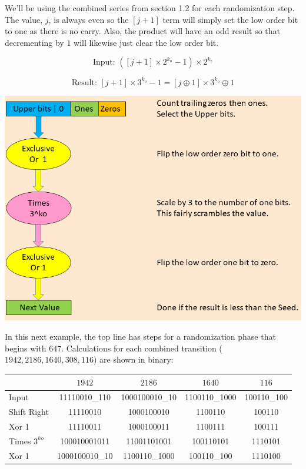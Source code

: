 \documentclass[letterpaper]{article}
\begin{document}
We'll be using the combined series from section 1.2 for each randomization step. The value, $j$, is always even so the $[j + 1]$ term will simply set the low order bit to one as there is no carry. Also, the product will have an odd result so that decrementing by $1$ will likewise just clear the low order bit.

\[
\text{Input: } ([j + 1] \times 2^{k_o} - 1) \times 2^{k_z}
\]

\[
\text{Result: } [j + 1] \times 3^{k_o} - 1 = [j \oplus 1] \times 3^{k_o} \oplus 1
\]

\onecolumn
\begin{center}
\includegraphics[width=\textwidth]{collatz_even}
\end{center}
\twocolumn 

In this next example, the top line has steps for a randomization phase that begins with $647$. Calculations for each combined transition ($1942, 2186, 1640, 308, 116$) are shown in binary:

\begin{center}
\begin{tabular}{|l|c|c|c|c|}
\hline
& \textbf{$1942$} & \textbf{$2186$} & \textbf{$1640$} & \textbf{$116$} \\ 
\hline
Input&11110010\_110&1000100010\_10&1100110\_1000&100110\_100 \\ 
\hline
Shift Right&11110010&1000100010&1100110&100110 \\ 
\hline
Xor 1&11110011&1000100011&1100111&100111 \\ 
\hline
Times $3^{ko}$&100010001011&11001101001&100110101&1110101 \\ 
\hline
Xor 1&1000100010\_10&1100110\_1000&100110\_100&1110100 \\ 
\hline
\end{tabular}
\end{center}
\end{document}

